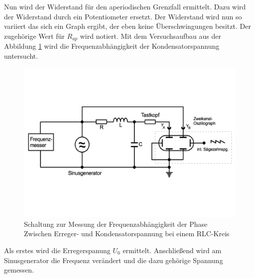 Nun wird der Widerstand für den aperiodischen Grenzfall ermittelt.
Dazu wird der Widerstand durch ein Potentiometer ersetzt. Der Widerstand wird nun so variiert das sich ein Graph ergibt, der eben keine Überschwingungen besitzt.
Der zugehörige Wert für $R_{ap}$ wird notiert.
Mit dem Versuchsaufbau aus der Abbildung \ref{aufbau2} wird die Frequenzabhängigkeit der Kondensatorspannung untersucht.
\newpage
\begin{figure}[h!]
  \centering
  \includegraphics[width=\textwidth]{aufbau2.pdf}
  \caption{Schaltung zur Messung der Frequenzabhängigkeit der Phase Zwischen Erreger- und Kondensatorspannung bei einem RLC-Kreis \cite{1}}
  \label{aufbau2}
\end{figure}
Als erstes wird die Erregerspanung $U_{0}$ ermittelt. Anschließend wird am Sinusgenerator die Frequenz \nu verändert und die dazu gehörige Spannung gemessen.\\

